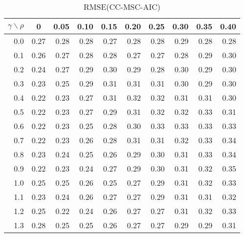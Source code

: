 \documentclass[12pt]{article}
\begin{document}
%
\begin{table}[!tbp]
\caption{RMSE(CC-MSC-AIC)}
 \begin{center}
 \begin{tabular}{r|rrrrrrrrr}\hline\hline
\multicolumn{1}{c|}{$\gamma\backslash\rho$}&\multicolumn{1}{c}{0}&\multicolumn{1}{c}{0.05}&\multicolumn{1}{c}{0.10}&\multicolumn{1}{c}{0.15}&\multicolumn{1}{c}{0.20}&\multicolumn{1}{c}{0.25}&\multicolumn{1}{c}{0.30}&\multicolumn{1}{c}{0.35}&\multicolumn{1}{c}{0.40}\tabularnewline
\hline
0.0&0.27&0.28&0.28&0.27&0.28&0.28&0.29&0.28&0.28\tabularnewline
0.1&0.26&0.27&0.28&0.28&0.27&0.27&0.28&0.29&0.30\tabularnewline
0.2&0.24&0.27&0.29&0.30&0.29&0.28&0.30&0.29&0.30\tabularnewline
0.3&0.23&0.25&0.29&0.31&0.31&0.31&0.30&0.29&0.30\tabularnewline
0.4&0.22&0.23&0.27&0.31&0.32&0.32&0.31&0.31&0.30\tabularnewline
0.5&0.22&0.23&0.27&0.29&0.31&0.32&0.32&0.33&0.31\tabularnewline
0.6&0.22&0.23&0.25&0.28&0.30&0.33&0.33&0.33&0.33\tabularnewline
0.7&0.22&0.23&0.26&0.28&0.31&0.31&0.32&0.33&0.34\tabularnewline
0.8&0.23&0.24&0.25&0.26&0.29&0.30&0.31&0.33&0.34\tabularnewline
0.9&0.22&0.23&0.24&0.27&0.29&0.30&0.31&0.32&0.35\tabularnewline
1.0&0.25&0.25&0.26&0.25&0.27&0.29&0.31&0.32&0.33\tabularnewline
1.1&0.23&0.24&0.26&0.27&0.27&0.29&0.31&0.31&0.32\tabularnewline
1.2&0.25&0.22&0.24&0.26&0.27&0.27&0.31&0.32&0.33\tabularnewline
1.3&0.28&0.25&0.25&0.26&0.27&0.27&0.29&0.29&0.31\tabularnewline
\hline
\end{tabular}

\end{center}

\end{table}
\end{document}
